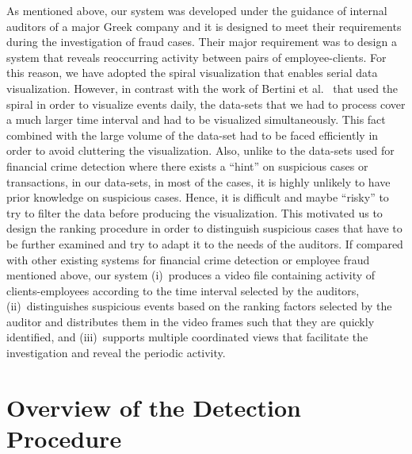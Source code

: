 \documentclass[conference]{IEEEtran}
\begin{document}
As mentioned above, our system was developed under the guidance of
internal auditors of a major Greek company and it is designed to
meet their requirements during the investigation of fraud cases.
Their major requirement was to design a system that reveals
reoccurring activity between pairs of employee-clients. For this
reason, we have adopted the spiral visualization that enables serial
data visualization. However, in contrast with the work of Bertini et
al.~\cite{BHL07} that used the spiral in order to visualize events
daily, the data-sets that we had to process cover a much larger time
interval and had to be visualized simultaneously. This fact combined
with the large volume of the data-set had to be faced efficiently in
order to avoid cluttering the visualization. Also, unlike to the
data-sets used for financial crime detection where there exists a
``hint'' on suspicious cases or transactions, in our data-sets, in
most of the cases, it is highly unlikely to have prior knowledge on
suspicious cases. Hence, it is difficult and maybe ``risky'' to try
to filter the data before producing the visualization. This
motivated us to design the ranking procedure in order to distinguish
suspicious cases that have to be further examined and try to adapt
it to the needs of the auditors. If compared with other existing
systems for financial crime detection or employee fraud mentioned
above, our system (i)~produces a video file containing activity of
clients-employees according to the time interval selected by the
auditors, (ii)~distinguishes suspicious events based on the ranking
factors selected by the auditor and distributes them in the video
frames such that they are quickly identified, and (iii)~supports
multiple coordinated views that facilitate the investigation and
reveal the periodic activity.

\section{Overview of the Detection Procedure}
\label{sec:overview}
\end{document}
